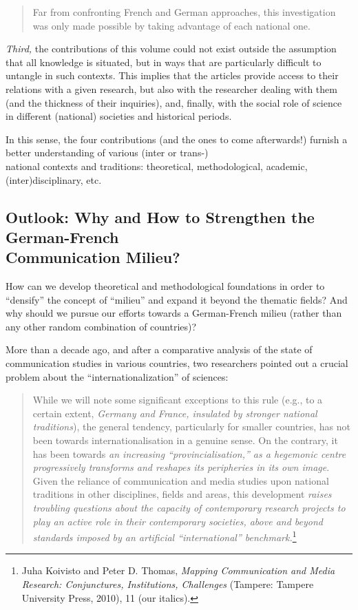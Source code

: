 \documentclass{tufte-handout}
\begin{document}
\newpage\begin{quote}
Far from confronting French and German approaches, this investigation
was only made possible by taking advantage of each national one.
\end{quote}

\emph{Third,} the contributions of this volume could not exist outside
the assumption that all knowledge is situated, but in ways that are
particularly difficult to untangle in such contexts. This implies that
the articles provide access to their relations with a given research,
but also with the researcher dealing with them (and the thickness of
their inquiries), and, finally, with the social role of science in
different (national) societies and historical periods.

In this sense, the four contributions (and the ones to come afterwards!)
furnish a better understanding of various (inter or trans-)\\\noindent national
contexts and traditions: theoretical, methodological, academic,
(inter)disciplinary, etc.

\hypertarget{outlook-why-and-how-to-strengthen-the-german-french-communication-milieu}{%
\subsection{Outlook: Why and How to Strengthen the German-French\\\noindent
Communication
Milieu?}\label{outlook-why-and-how-to-strengthen-the-german-french-communication-milieu}}

How can we develop theoretical and methodological foundations in order
to ``densify'' the concept of ``milieu'' and expand it beyond the
thematic fields? And why should we pursue our efforts towards a
German-French milieu (rather than any other random combination of
countries)?

More than a decade ago, and after a comparative analysis of the state of
communication studies in various countries, two researchers pointed out
a crucial problem about the ``internationalization'' of sciences:

\begin{quote}
While we will note some significant exceptions to this rule (e.g., to a
certain extent, \emph{Germany and France, insulated by stronger national
traditions}), the general tendency, particularly for smaller countries,
has not been towards internationalisation in a genuine sense. On the
contrary, it has been towards \emph{an increasing ``provincialisation,''
as a hegemonic centre progressively transforms and reshapes its
peripheries in its own image}. Given the reliance of communication and
media studies upon national traditions in other disciplines, fields and
areas, this development \emph{raises troubling questions about the
capacity of contemporary research projects to play an active role in
their contemporary societies, above and beyond standards imposed by an
artificial ``international'' benchmark.}\footnote{Juha Koivisto and
  Peter D. Thomas, \emph{Mapping Communication and Media Research:
  Conjunctures, Institutions, Challenges} (Tampere: Tampere University
  Press, 2010), 11 (our italics).}
\end{quote}
\end{document}
